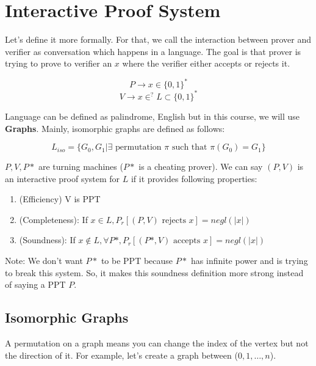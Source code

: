 \documentclass{article}
\begin{document}
\section{Interactive Proof System}\label{week2-interactive-proof-system}

Let's define it more formally. For that, we call the interaction between prover and verifier as conversation which happens in a language. The goal is that prover is trying to prove to verifier an $x$ where the verifier either accepts or rejects it.

$$ P \rightarrow x \in \{0,1\}^* $$
$$ V \rightarrow x \in^{?} L \subset \{0,1\}^* $$

Language can be defined as palindrome, English but in this course, we will use \textbf{Graphs}. Mainly, isomorphic graphs are defined as follows:

$$L_{iso} = \{G_0, G_1 | \exists \text{ permutation } \pi \text{ such that } \pi(G_0) = G_1\}$$

$P, V, P*$ are turning machines ($P*$ is a cheating prover). We can say $(P,V)$ is an interactive proof system for $L$ if it provides following properties:

\begin{enumerate}
    \item (Efficiency) V is PPT
    \item (Completeness): If $x \in L, P_r[(P,V) \text{ rejects } x] = negl(|x|)$
    \item (Soundness): If $x \notin L, \forall P*, P_r[(P*,V) \text{ accepts } x] = negl(|x|)$
\end{enumerate}

Note: We don't want $P*$ to be PPT because $P*$ has infinite power and is trying to break this system. So, it makes this soundness definition more strong instead of saying a PPT $P$.

\subsection{Isomorphic Graphs}
A permutation on a graph means you can change the index of the vertex but not the direction of it. For example, let's create a graph between ($0, 1, \ldots, n$).
\end{document}
